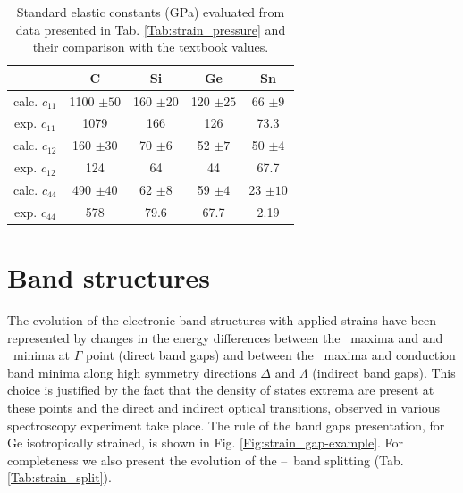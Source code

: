 \begin{table}[!htbp]
    \caption{Standard elastic constants (GPa) evaluated from data presented in Tab. \ref{Tab:strain_pressure} and their comparison with the textbook values\cite{nsm}.}
    \centering
    \begin{tabular}{|c|c|c|c|c|}
        \hline
        & C             & Si           & Ge           & Sn          \\ \hline
        calc. $c_{11}$  & 1100 $\pm 50$ & 160 $\pm 20$ & 120 $\pm 25$ & 66 $\pm 9$  \\ \hline
        exp. $c_{11}$  & 1079          & 166          & 126          & 73.3        \\ \hline
        calc. $c_{12}$ & 160 $\pm 30$  & 70 $\pm 6$   & 52 $\pm 7$   & 50 $\pm 4$  \\ \hline
        exp. $c_{12}$  & 124           & 64           & 44           & 67.7        \\ \hline
        calc. $c_{44}$ & 490 $\pm 40$  & 62 $\pm 8$   & 59 $\pm 4$   & 23 $\pm 10$ \\ \hline
        exp. $c_{44}$  & 578           & 79.6         & 67.7         & 2.19        \\ \hline
    \end{tabular}
    \label{Tab:strain_elastic}
\end{table}
\ornament

\section{Band structures}

The evolution of the electronic band structures with applied strains have been represented by changes in the energy differences between the \VB\ maxima and and \CB\ minima at $\Gamma$ point (direct band gaps) and between the \VB\ maxima and conduction band minima along high symmetry directions $\Delta$ and  $\Lambda$ (indirect band gaps).
This choice is justified by the fact that the density of states extrema are present at these points and the direct and indirect optical transitions, observed in various spectroscopy experiment take place.
The rule of the band gaps presentation, for Ge isotropically strained, is shown in Fig. \ref{Fig:strain_gap-example}.
For completeness we also present the evolution of the \LH--\HH\ band splitting (Tab. \ref{Tab:strain_split}).

